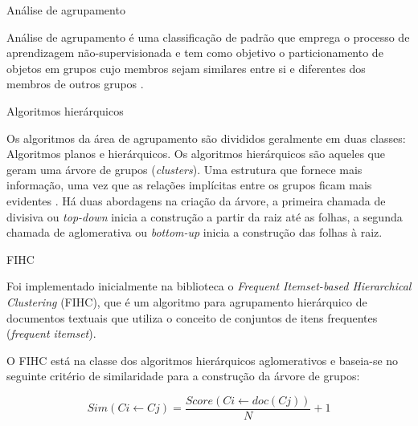 \documentclass[final]{beamer}
\newlength{\onecolwid}
\newlength{\twocolwid}
\begin{document}
\begin{frame}[t]
\begin{columns}[t]
\begin{column}{\twocolwid}
\begin{columns}[t,totalwidth=\twocolwid]
\begin{column}{\onecolwid}
\begin{block}{Análise de agrupamento}

Análise de agrupamento é uma classificação de padrão que emprega o processo de aprendizagem não-supervisionada e tem como objetivo o particionamento de objetos em grupos cujo membros sejam similares entre si e diferentes dos membros de outros grupos \cite{Jain:1999}.


\end{block}

\begin{block}{Algoritmos hierárquicos}

Os algoritmos da área de agrupamento são divididos geralmente em duas classes: Algoritmos planos e hierárquicos.
Os algoritmos hierárquicos são aqueles que geram uma árvore de grupos (\textit{clusters}). Uma estrutura que fornece mais informação, uma vez que as relações implícitas entre os grupos ficam mais evidentes \cite{Manning:2009}.
Há duas abordagens na criação da árvore, a primeira chamada de divisiva ou \textit{top-down} inicia a construção a partir da raiz até as folhas, a segunda chamada de aglomerativa ou \textit{bottom-up} inicia a construção das folhas à raiz.

\end{block}


\begin{block}{FIHC}

Foi implementado inicialmente na biblioteca o \textit{Frequent Itemset-based Hierarchical Clustering} (FIHC), que é um algoritmo para agrupamento hierárquico de documentos textuais \cite{Martin:2004} que utiliza o conceito de conjuntos de itens frequentes (\textit{frequent itemset}).

O FIHC está na classe dos algoritmos hierárquicos aglomerativos e baseia-se no seguinte critério de similaridade para a construção da árvore de grupos:

\begin{equation}
Sim(Ci \gets Cj) = \frac{Score(Ci \gets doc(Cj))}{N} + 1
\label{eqn:Sim}
\end{equation}


\end{block}
\end{column}
\end{columns}
\end{column}
\end{columns}
\end{frame}
\end{document}
